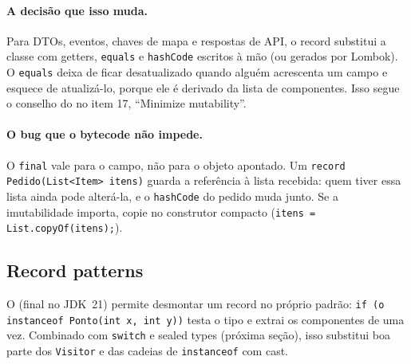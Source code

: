 \paragraph{A decisão que isso muda.}
Para DTOs, eventos, chaves de mapa e respostas de API, o record substitui
a classe com getters, \texttt{equals} e \texttt{hashCode} escritos à mão
(ou gerados por Lombok). O \texttt{equals} deixa de ficar desatualizado
quando alguém acrescenta um campo e esquece de atualizá-lo, porque ele é
derivado da lista de componentes. Isso segue o conselho do
 no item 17, \enquote{Minimize mutability}.

\paragraph{O bug que o bytecode não impede.}
O \texttt{final} vale para o campo, não para o objeto apontado. Um
\texttt{record Pedido(List<Item> itens)} guarda a referência à lista
recebida: quem tiver essa lista ainda pode alterá-la, e o
\texttt{hashCode} do pedido muda junto. Se a imutabilidade importa, copie
no construtor compacto (\texttt{itens = List.copyOf(itens);}).

\subsection*{Record patterns}
O  (final no JDK~21) permite desmontar um record
no próprio padrão: \texttt{if (o instanceof Ponto(int x, int y))} testa o
tipo e extrai os componentes de uma vez. Combinado com
\texttt{switch} e sealed types (próxima seção), isso substitui boa parte
dos \texttt{Visitor} e das cadeias de \texttt{instanceof} com cast.

